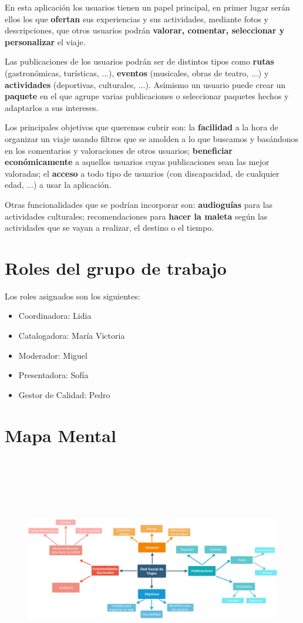 \documentclass[11pt]{article}
\begin{document}
En esta aplicación los usuarios tienen un papel principal, en primer lugar serán ellos los que \textbf{ofertan} sus experiencias y sus actividades, mediante fotos y descripciones, que otros usuarios podrán \textbf{valorar, comentar, seleccionar y personalizar} el viaje.

Las publicaciones de los usuarios podrán ser de distintos tipos como \textbf{rutas} (gastronómicas, turísticas, ...), \textbf{eventos} (musicales, obras de teatro, ...) y \textbf{actividades} (deportivas, culturales, ...). Asímismo un usuario puede crear un \textbf{paquete} en el que agrupe varias publicaciones o seleccionar paquetes hechos y adaptarlos a sus intereses.

Los principales objetivos que queremos cubrir son: la \textbf{facilidad} a la hora de organizar un viaje usando filtros que se amolden a lo que buscamos y basándonos en los comentarios y valoraciones de otros usuarios; \textbf{beneficiar económicamente} a aquellos usuarios cuyas publicaciones sean las mejor valoradas; el \textbf{acceso} a todo tipo de usuarios (con discapacidad, de cualquier edad, ...) a usar la aplicación.

Otras funcionalidades que se podrían incorporar son: \textbf{audioguías} para las actividades culturales; recomendaciones para \textbf{hacer la maleta} según las actividades que se vayan a realizar, el destino o el tiempo.

\section {Roles del grupo de trabajo}
Los roles asignados son los siguientes:

\begin{itemize}
\item{Coordinadora}: Lidia
\item{Catalogadora}: María Victoria
\item{Moderador}: Miguel
\item{Presentadora}: Sofía
\item{Gestor de Calidad}: Pedro

\end{itemize}

\newpage
{}
\section {Mapa Mental}
\begin{figure}[h]
\centering
\includegraphics[width=25cm, height=10cm] {MapaMentalp1}
\end{figure}
\end{document}

